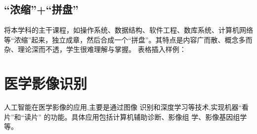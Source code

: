 \documentclass{article}
\begin{document}
\par



\subsection{“浓缩”+“拼盘”}
将本学科的主干课程，如操作系统、数据结构、软件工程、数库系统、计算机网络等“浓缩”起来，独立成章，然后合成一个“拼盘”。其特点是内容广而散、概念多而杂、理论深而不透，学生很难理解与掌握。
表格插入样例：\par



\section{医学影像识别}
人工智能在医学影像的应用,主要是通过图像 识别和深度学习等技术,实现机器“看片”和“读片” 的功能。具体应用包括计算机辅助诊断、影像组 学、影像基因组学等。
\end{document}
